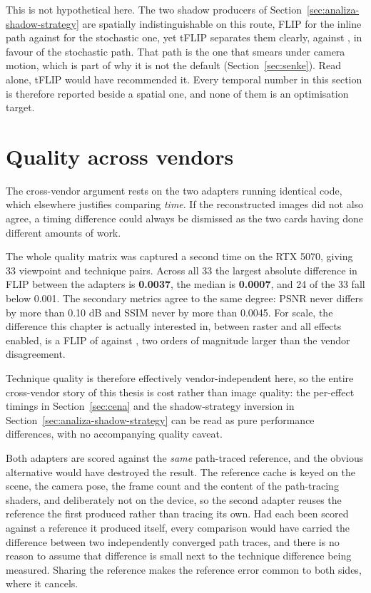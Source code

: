 This is not hypothetical here. The two shadow producers of Section~\ref{sec:analiza-shadow-strategy}
are spatially indistinguishable on this route, FLIP \mRtShadowFlip{} for the inline path against
\mMegalightsFlip{} for the stochastic one, yet tFLIP separates them clearly, \mRtShadowTflip{}
against \mMegalightsTflip{}, in favour of the stochastic path. That path is the one that smears under camera
motion, which is part of why it is not the default (Section~\ref{sec:senke}). Read alone, tFLIP would
have recommended it. Every temporal number in this section is therefore reported beside a spatial one,
and none of them is an optimisation target.

\section{Quality across vendors}
\label{sec:cross-vendor-quality}

The cross-vendor argument rests on the two adapters running identical code, which elsewhere justifies
comparing \emph{time}. If the reconstructed images did not also agree, a timing difference could
always be dismissed as the two cards having done different amounts of work.

The whole quality matrix was captured a second time on the RTX 5070, giving 33 viewpoint and technique
pairs. Across all 33 the largest absolute difference in FLIP between the adapters is \textbf{0.0037},
the median is \textbf{0.0007}, and 24 of the 33 fall below 0.001. The secondary metrics agree to the
same degree: PSNR never differs by more than 0.10 dB and SSIM never by more than 0.0045. For scale,
the difference this chapter is actually interested in, between raster and all effects enabled, is a
FLIP of \qRasterFlip{} against \qAllRtFlip{}, two orders of magnitude larger than the vendor
disagreement.

Technique quality is therefore effectively vendor-independent here, so the entire
cross-vendor story of this thesis is cost rather than image quality:
the per-effect timings in Section~\ref{sec:cena} and the shadow-strategy inversion in
Section~\ref{sec:analiza-shadow-strategy} can be read as pure performance differences, with no
accompanying quality caveat.

Both adapters are scored against the \emph{same} path-traced reference, and the obvious alternative
would have destroyed the result. The
reference cache is keyed on the scene, the camera pose, the frame count and the content of the
path-tracing shaders, and deliberately not on the device, so the second adapter reuses the reference
the first produced rather than tracing its own. Had each been scored against a reference it produced
itself, every comparison would have carried the difference between two independently converged path
traces, and there is no reason to assume that difference is small next to the technique difference
being measured. Sharing the reference makes the reference error common to both sides, where it
cancels.

